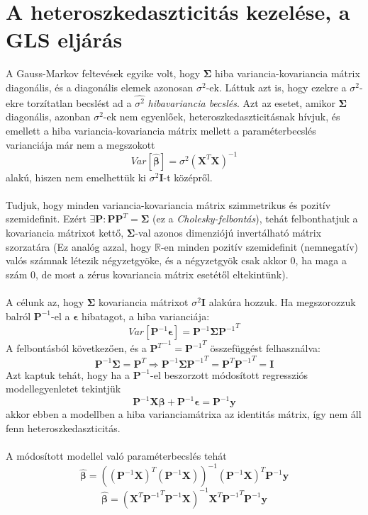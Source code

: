 \documentclass[14p]{report}
\def\pmb{\boldsymbol}
\def\ebeta{\hat{\pmb{\beta}}}
\def\e{\epsilon}
\newcounter{x}
\newcounter{y}
\newcounter{z}
\begin{document}
	\section{A heteroszkedaszticitás kezelése, a GLS eljárás}
	A Gauss-Markov feltevések egyike volt, hogy $\pmb{\Sigma}$ hiba variancia-kovariancia mátrix diagonális, és a diagonális elemek azonosan $\sigma^2$-ek. Láttuk azt is, hogy ezekre a $\sigma^2$-ekre torzítatlan becslést ad a $\widehat{\sigma^2}$ \emph{hibavariancia becslés}. Azt az esetet, amikor $\pmb{\Sigma}$ diagonális, azonban $\sigma^2$-ek nem egyenlőek, heteroszkedaszticitásnak hívjuk, és emellett a hiba variancia-kovariancia mátrix mellett a paraméterbecslés varianciája már nem a megszokott
	\[
		Var[\ebeta] = \sigma^2(\pmb{X}^T\pmb{X})^{-1}
	\]
	alakú, hiszen nem emelhettük ki $\sigma^2\pmb{I}$-t középről.
	\\
	\\
	Tudjuk, hogy minden variancia-kovariancia mátrix szimmetrikus és pozitív szemidefinit. Ezért $\exists \pmb{P} : \pmb{P}\pmb{P}^T = \pmb{\Sigma}$ (ez a \emph{Cholesky-felbontás}), tehát felbonthatjuk a kovariancia mátrixot kettő, $\pmb{\Sigma}$-val azonos dimenziójú invertálható mátrix szorzatára (Ez analóg azzal, hogy $\mathbb{R}$-en minden pozitív szemidefinit (nemnegatív) valós számnak létezik négyzetgyöke, és a négyzetgyök csak akkor $0$, ha maga a szám $0$, de most a zérus kovariancia mátrix esetétől eltekintünk).
	\\
	\\
	A célunk az, hogy $\pmb{\Sigma}$ kovariancia mátrixot $\sigma^2\pmb{I}$ alakúra hozzuk. Ha megszorozzuk balról $\pmb{P}^{-1}$-el a $\pmb{\e}$ hibatagot, a hiba varianciája:
	\[
		Var[\pmb{P}^{-1}\pmb{\e}] = \pmb{P}^{-1}\pmb{\Sigma}{\pmb{P}^{-1}}^T
	\]
	A felbontásból következően, és a ${\pmb{P}^T}^{-1} = {\pmb{P}^{-1}}^T$ összefüggést felhasználva:
	\[
		\pmb{P}^{-1}\pmb{\Sigma} = \pmb{P}^T \Longrightarrow \pmb{P}^{-1}\pmb{\Sigma}{\pmb{P}^{-1}}^T = \pmb{P}^T{\pmb{P}^{-1}}^T = \pmb{I}
	\]
	Azt kaptuk tehát, hogy ha a $\pmb{P}^{-1}$-el beszorzott módosított regressziós modellegyenletet tekintjük
	\[
		\pmb{P}^{-1}\pmb{X}\pmb{\beta} + \pmb{P}^{-1}\pmb{\e} = \pmb{P}^{-1}\pmb{y}
	\]
	akkor ebben a modellben a hiba varianciamátrixa az identitás mátrix, így nem áll fenn heteroszkedaszticitás.
	\\
	\\
	A módosított modellel való paraméterbecslés tehát
	\[
		\ebeta = ((\pmb{P}^{-1}\pmb{X})^T(\pmb{P}^{-1}\pmb{X}))^{-1}(\pmb{P}^{-1}\pmb{X})^T\pmb{P}^{-1}\pmb{y}
	\]
	\[
		\ebeta = (\pmb{X}^T{\pmb{P}^{-1}}^T\pmb{P}^{-1}\pmb{X})^{-1}\pmb{X}^T{\pmb{P}^{-1}}^T\pmb{P}^{-1}\pmb{y}
	\]
\end{document}
